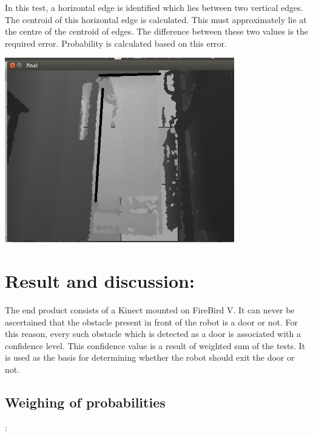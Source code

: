 \documentclass{report}
\begin{document}
In this test, a horizontal edge is identified which lies between two vertical edges. The centroid of this horizontal edge is calculated. This must approximately lie at the centre of the centroid of edges. The difference between these two values is the required error. Probability is calculated based on this error.

\includegraphics[width = 10cm]{horizontal.png}

\chapter{Result and discussion:} 
The end product consists of a Kinect mounted on FireBird V. It can never be ascertained that the obstacle present in front of
the robot is a door or not. For this reason, every such obstacle which is detected as a door is associated with a confidence
level. This confidence value is a result of weighted sum of the tests. It is used as the basis for determining whether the robot
should exit the door or not.

\section{Weighing of probabilities}:
\end{document}
